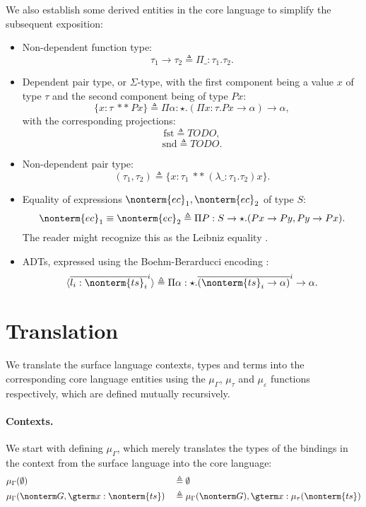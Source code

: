\documentclass[a4paper]{article}
\begin{document}
We also establish some derived entities in the core language to simplify the subsequent exposition:

\begin{itemize}
  \item Non-dependent function type:
    \[
      \tau_1 \rightarrow \tau_2 \triangleq \Pi \_ : \tau_1. \tau_2.
    \]
  \item Dependent pair type, or $\Sigma$-type, with the first component being a value $x$ of type $\tau$ and the second component being of type $P x$:
    \[
      \{ x : \tau\ **\ P x \} \triangleq \Pi \alpha : \star. (\Pi x : \tau. P x \rightarrow \alpha) \rightarrow \alpha,
    \]
    with the corresponding projections:
    \[
      \text{fst} \triangleq TODO,
    \]
    \[
      \text{snd} \triangleq TODO.
    \]
  \item Non-dependent pair type:
    \[
      (\tau_1, \tau_2) \triangleq \{ x : \tau_1\ **\ (\lambda \_ : \tau_1. \tau_2) x \}.
    \]
  \item Equality of expressions $\nonterm{ec}_1, \nonterm{ec}_2$ of type $S$:
    \[
      \nonterm{ec}_1 \equiv \nonterm{ec}_2 \triangleq \Pi P : S \rightarrow \star. (P x \rightarrow P y, P y \rightarrow P x).
    \]
    The reader might recognize this as the Leibniz equality \cite{FindSomethingForThis}.
  \item ADTs, expressed using the Boehm-Berarducci encoding \cite{Bohm85}:
    \[
      \langle \overline{l_i : \nonterm{ts}_i}^i \rangle
        \triangleq \Pi \alpha : \star. \overline{(\nonterm{ts}_i \rightarrow \alpha)}^i \rightarrow \alpha.
    \]
\end{itemize}

\section{Translation}

\newcommand{\tranctx}{\mu_\Gamma}
\newcommand{\tranty}{\mu_\tau}
\newcommand{\tranterm}{\mu_\varepsilon}

We translate the surface language contexts, types and terms into the corresponding core language entities
using the $\mu_\Gamma$, $\mu_\tau$ and $\mu_\varepsilon$ functions respectively,
which are defined mutually recursively.

\paragraph{Contexts.}
We start with defining $\tranctx$,
which merely translates the types of the bindings in the context from the surface language into the core language:
\begin{equation}
\begin{aligned}
  & \tranctx(\emptyset)                                       && \triangleq \emptyset                                               \\
  & \tranctx(\nonterm G, \gterm x : \nonterm{ts})             && \triangleq \tranctx(\nonterm G), \gterm x : \tranty(\nonterm{ts})  \\
\end{aligned}
\end{equation}
\end{document}
